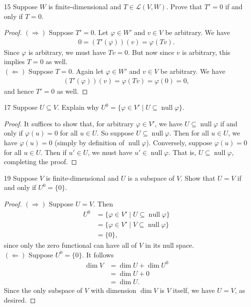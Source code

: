 \documentclass{extarticle}
\newenvironment{problem}[1]{\begin{prob*}{#1}{}}{\end{prob*}}
\newcommand{\Hom}{\mathcal{L}}
\DeclareMathOperator{\Null}{null}
\begin{document}
\begin{problem}{15}
Suppose $W$ is finite-dimensional and $T\in\Hom(V,W)$.  Prove that $T' = 0$ if and only if $T = 0$.
\end{problem}
\begin{proof}
$(\Rightarrow)$ Suppose $T' = 0$.  Let $\varphi\in W'$ and $v\in V$ be arbitrary.  We have
\begin{align*}
0 = (T'(\varphi))(v) = \varphi(Tv).
\end{align*}
Since $\varphi$ is arbitrary, we must have $Tv = 0$.  But now since $v$ is arbitrary, this implies $T = 0$ as well.\\
\indent $(\Leftarrow)$ Suppose $T = 0$.  Again let $\varphi\in W'$ and $v\in V$ be arbitrary.  We have
\begin{align*}
(T'(\varphi))(v) = \varphi(Tv) = \varphi(0) = 0,
\end{align*}
and hence $T' = 0$ as well.
\end{proof}

\begin{problem}{17}
Suppose $U\subseteq V$.  Explain why $U^0=\{\varphi\in V'\mid U\subseteq \Null\varphi\}$.  
\end{problem}
\begin{proof}
It suffices to show that, for arbitrary $\varphi\in V'$, we have $U\subseteq \Null\varphi$ if and only if $\varphi(u)=0$ for all $u \in U$.  So suppose $U \subseteq\Null\varphi$.  Then for all $u\in U$, we have $\varphi(u) = 0$ (simply by definition of $\Null\varphi$).  Conversely, suppose $\varphi(u)=0$ for all $u\in U$.  Then if $u'\in U$, we must have $u'\in\Null\varphi$.  That is, $U\subseteq\Null\varphi$, completing the proof.
\end{proof}

\begin{problem}{19}
Suppose $V$ is finite-dimensional and $U$ is a subspace of $V$.  Show that $U = V$ if and only if $U^0=\{0\}$. 
\end{problem}
\begin{proof}
$(\Rightarrow)$ Suppose $U=V$.  Then 
\begin{align*}
U^0 &= \{\varphi \in V'\mid U\subseteq \Null\varphi\}\\
&=  \{\varphi \in V'\mid V\subseteq \Null\varphi\}\\
&= \{0\},
\end{align*}
since only the zero functional can have all of $V$ in its null space.\\
\indent $(\Leftarrow)$ Suppose $U^0 = \{0\}$.  It follows
\begin{align*}
\dim V &= \dim U + \dim U^0\\
           &= \dim U + 0\\
           &= \dim U.
\end{align*}
Since the only subspace of $V$ with dimension $\dim V$ is $V$ itself, we have $U = V$, as desired.
\end{proof}
\end{document}
